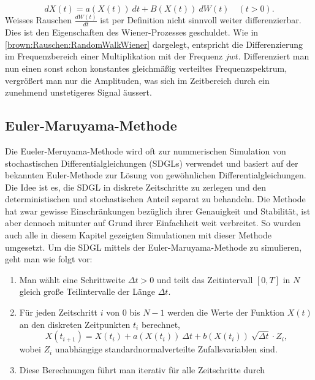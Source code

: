 \begin{equation}
	dX(t) = a(X(t)) \ dt + B(X(t)) \ dW(t) \quad (t>0).
\end{equation}
Weisses Rauschen $ \frac{dW(t)}{dt} $ ist per Definition nicht sinnvoll weiter differenzierbar. Dies ist den Eigenschaften des Wiener-Prozesses geschuldet. Wie in \ref{brown:Rauschen:RandomWalkWiener} dargelegt, entspricht die Differenzierung im Frequenzbereich einer Multiplikation mit der Frequenz $ jwt $. Differenziert man nun einen sonst schon konstantes gleichmäßig verteiltes Frequenzspektrum, vergrößert man nur die Amplituden, was sich im Zeitbereich durch ein zunehmend unstetigeres Signal äussert.



\subsection{Euler-Maruyama-Methode\label{brown:Simulation}}

Die Eueler-Meruyama-Methode wird oft zur nummerischen Simulation von stochastischen Differentialgleichungen (SDGLs) verwendet und basiert auf der bekannten Euler-Methode zur Lösung von gewöhnlichen Differentialgleichungen. Die Idee ist es, die SDGL in diskrete Zeitschritte zu zerlegen und den deterministischen und stochastischen Anteil separat zu behandeln. Die Methode hat zwar gewisse Einschränkungen bezüglich ihrer Genauigkeit und Stabilität, ist aber dennoch mitunter auf Grund ihrer Einfachheit weit verbreitet. \cite{Bayram2018} So wurden auch alle in diesem Kapitel gezeigten Simulationen mit dieser Methode umgesetzt. Um die SDGL mittels der Euler-Maruyama-Methode zu simulieren, geht man wie folgt vor:




\begin{enumerate}
	\item Man wählt eine Schrittweite $ \Delta t > 0 $ und teilt das Zeitintervall $ [0, T] $ in $ N $ gleich große Teilintervalle der Länge $ \Delta t $.
	\item Für jeden Zeitschritt $ i $ von $ 0 $ bis $ N-1 $ werden die Werte der Funktion $ X(t) $ an den diskreten Zeitpunkten $ t_i $ berechnet,
	\begin{equation}
		X(t_{i+1}) = X(t_i) + a(X(t_i)) \ \Delta t + b(X(t_i)) \ \sqrt{\Delta t} \cdot Z_i,
	\end{equation}
	wobei $ Z_i $ unabhängige standardnormalverteilte Zufallsvariablen sind.
	\item Diese Berechnungen führt man iterativ für alle Zeitschritte durch
\end{enumerate}

